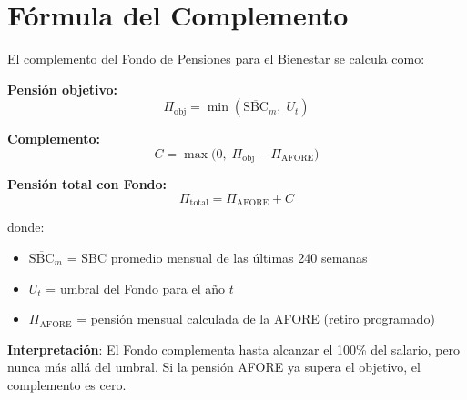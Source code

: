 \documentclass[11pt,a4paper]{report}
\begin{document}
\section{F\'ormula del Complemento}

\begin{tcolorbox}[colback=blue!5!white, colframe=blue!75!black, title=\textbf{Definici\'on Formal}]
El complemento del Fondo de Pensiones para el Bienestar se calcula como:

\textbf{Pensi\'on objetivo:}
\[
\Pi_{\text{obj}} = \min(\overline{\text{SBC}}_m,\; U_t)
\]

\textbf{Complemento:}
\[
C = \max\!\big(0,\; \Pi_{\text{obj}} - \Pi_{\text{AFORE}}\big)
\]

\textbf{Pensi\'on total con Fondo:}
\[
\Pi_{\text{total}} = \Pi_{\text{AFORE}} + C
\]

donde:
\begin{itemize}[nosep]
\item $\overline{\text{SBC}}_m$ = SBC promedio mensual de las \'ultimas 240 semanas
\item $U_t$ = umbral del Fondo para el a\~no $t$
\item $\Pi_{\text{AFORE}}$ = pensi\'on mensual calculada de la AFORE (retiro programado)
\end{itemize}

\textbf{Interpretaci\'on}: El Fondo complementa hasta alcanzar el 100\% del salario, pero nunca m\'as all\'a del umbral. Si la pensi\'on AFORE ya supera el objetivo, el complemento es cero.
\end{tcolorbox}
\end{document}
